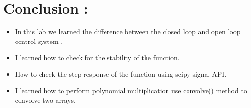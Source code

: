 \documentclass[11pt]{article}
\begin{document}
\section{Conclusion :}
\begin{itemize}
\item In this lab we learned the difference between the closed loop and open loop control system .
\item I learned how to check for the stability of the function.
\item How to check the step response of the function using scipy signal API.
\item I learned how to perform polynomial multiplication use convolve() method to convolve two arrays. 
\end{itemize}
\end{document}
